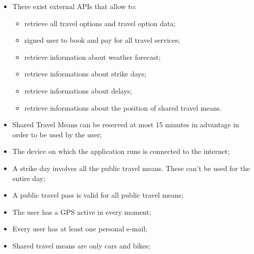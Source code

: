 \begin{itemize}

\item There exist external APIs that allow to:
\begin{itemize}
\item retrieve all travel options and travel option data;
\item signed user to book and pay for all travel services;
\item retrieve information about weather forecast;
\item retrieve informations about strike days;
\item retrieve informations about delays;
\item retrieve informations about the position of shared travel means.
\end{itemize}

\item Shared Travel Means can be reserved at most 15 minutes in advantage in order to be used by the user;

\item The device on which the application runs is connected to the internet;

\item A strike day involves all the public travel means. These can't be used for the entire day;

\item A public travel pass is valid for all public travel means;

\item The user has a GPS active in every moment;

\item Every user has at least one personal e-mail;

\item Shared travel means are only cars and bikes;


\end{itemize}




